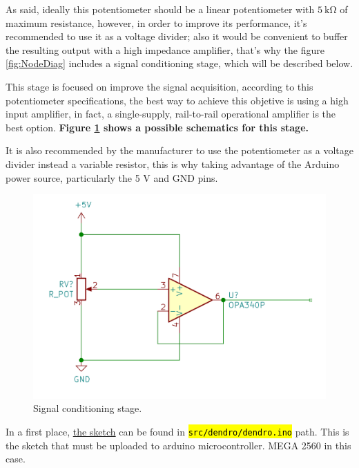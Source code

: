 \documentclass[11pt,a4paper,dvipsnames,twoside]{article}
\newcounter{subsubsubsection}[subsubsection]
\newcommand{\doubt}[1] {\textbf{\color{Red3}#1}}
\newcommand{\cmd}[1] {\hl{\texttt{#1}}}
\begin{document}
As said, ideally this potentiometer should be a linear potentiometer with $5\ \si{\kilo\ohm}$ of maximum resistance, however, in order to improve its performance, it's recommended to use it as a voltage divider; also it would be convenient to buffer the resulting output with a high impedance amplifier, that's why the figure \ref{fig:NodeDiag} includes a signal conditioning stage, which will be described below.

This stage is focused on improve the signal acquisition, according to this potentiometer specifications, the best way to achieve this objetive is using a high input amplifier, in fact, a single-supply, rail-to-rail operational amplifier is the best option. \doubt{Figure \ref{fig:SignalCond} shows a possible schematics for this stage.}

It is also recommended by the manufacturer to use the potentiometer as a voltage divider instead a variable resistor, this is why taking advantage of the Arduino power source, particularly the 5 \si{\volt} and GND pins.

\begin{figure}[htp]
  \centering
    \includegraphics[width=.9\textwidth]{../schemes/Signal_Conditioning.png}
  \caption{Signal conditioning stage.}
  \label{fig:SignalCond}
\end{figure}

In a first place, \href{https://github.com/WyRe/lora-arduino-dendrometer/blob/master/src/arduino/dendro/dendro.ino}{the sketch} can be found in \cmd{src/dendro/dendro.ino} path. This is the sketch that must be uploaded to arduino microcontroller. MEGA 2560 in this case.
\end{document}
